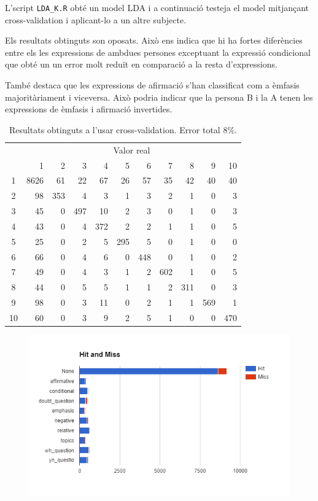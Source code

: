 \documentclass[a4paper]{article}
\begin{document}
L’script \verb|LDA_K.R|  obté un model LDA i a continuació testeja el model mitjançant cross-validation i aplicant-lo a un altre subjecte.

Els resultats obtinguts son oposats. Això ens indica que hi ha fortes diferències entre els les expressions de ambdues persones exceptuant la expressió condicional que obté un un error molt reduït en comparació a la resta d’expressions.

També destaca que les expressions de afirmació s’han classificat com a èmfasis majoritàriament i viceversa. Això podria indicar que la persona B i la A tenen les expressions de èmfasis i afirmació invertides.

\begin{table}[H]
	\centering
	\begin{tabular}{c|rrrrrrrrrr}
		& \multicolumn{10}{c}{Valor real} \\
		 & 1 & 2 & 3 & 4 & 5 & 6 & 7 & 8 & 9 & 10 \\
		 \hline
		1 & 8626 & 61 & 22 & 67 & 26 & 57 & 35 & 42 & 40 & 40 \\
		2 & 98 & 353 & 4 & 3 & 1 & 3 & 2 & 1 & 0 & 3 \\
		3 & 45 & 0 & 497 & 10 & 2 & 3 & 0 & 1 & 0 & 3 \\
		4 & 43 & 0 & 4 & 372 & 2 & 2 & 1 & 1 & 0 & 5 \\
		5 & 25 & 0 & 2 & 5 & 295 & 5 & 0 & 1 & 0 & 0 \\
		6 & 66 & 0 & 4 & 6 & 0 & 448 & 0 & 1 & 0 & 2 \\
		7 & 49 & 0 & 4 & 3 & 1 & 2 & 602 & 1 & 0 & 5 \\
		8 & 44 & 0 & 5 & 5 & 1 & 1 & 2 & 311 & 0 & 3 \\
		9 & 98 & 0 & 3 & 11 & 0 & 2 & 1 & 1 & 569 & 1 \\
		10 & 60 & 0 & 3 & 9 & 2 & 5 & 1 & 0 & 0 & 470 \\
	\end{tabular}
	\caption{Resultats obtinguts a l'usar cross-validation. Error total 8\%.}
\end{table}

\begin{figure}[H]
	\centering
	\includegraphics[width=\textwidth]{images/image00}
\end{figure}
\end{document}
